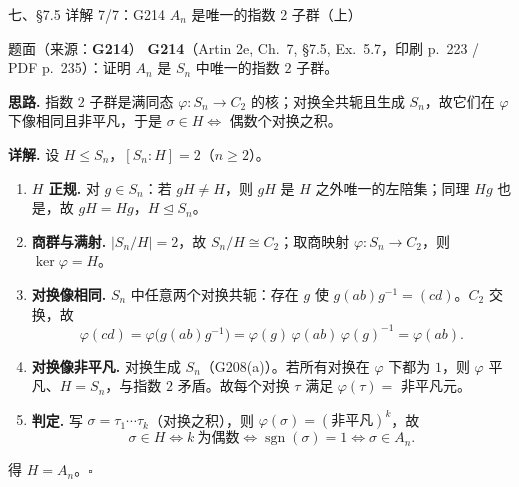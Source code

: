 \documentclass[aspectratio=169,10pt,fontset=none]{ctexbeamer}
\newcommand{\ex}[1]{\textcolor{accent}{\footnotesize\bfseries #1}}
\newcommand{\key}[1]{\textcolor{ink}{\bfseries #1}}
\begin{document}
\begin{frame}[t]{七、\S7.5 详解 7/7：G214 $A_n$ 是唯一的指数 2 子群（上）}
\label{ex:G214}
\scriptsize
\begin{block}{\footnotesize 题面（来源：\ex{G214}）}
\scriptsize
\ex{G214}（Artin 2e, Ch.~7, \S7.5, Ex.~5.7，印刷 p.~223 / PDF p.~235）：证明 $A_n$ 是 $S_n$ 中唯一的指数 $2$ 子群。
\end{block}
\key{思路.} 指数 $2$ 子群是满同态 $\varphi:S_n\to C_2$ 的核；对换全共轭且生成 $S_n$，故它们在 $\varphi$ 下像相同且非平凡，于是 $\sigma\in H\iff$ 偶数个对换之积。

\key{详解.} 设 $H\le S_n$，$[S_n:H]=2$（$n\ge2$）。
\begin{enumerate}\setlength{\itemsep}{0pt}\setlength{\parskip}{0pt}
  \item \key{$H$ 正规.} 对 $g\in S_n$：若 $gH\ne H$，则 $gH$ 是 $H$ 之外唯一的左陪集；同理 $Hg$ 也是，故 $gH=Hg$，$H\trianglelefteq S_n$。
  \item \key{商群与满射.} $|S_n/H|=2$，故 $S_n/H\cong C_2$；取商映射 $\varphi:S_n\to C_2$，则 $\ker\varphi=H$。
  \item \key{对换像相同.} $S_n$ 中任意两个对换共轭：存在 $g$ 使 $g(ab)g^{-1}=(cd)$。$C_2$ 交换，故
  \[ \varphi(cd)=\varphi\bigl(g(ab)g^{-1}\bigr)=\varphi(g)\,\varphi(ab)\,\varphi(g)^{-1}=\varphi(ab). \]
  \item \key{对换像非平凡.} 对换生成 $S_n$（G208(a)）。若所有对换在 $\varphi$ 下都为 $1$，则 $\varphi$ 平凡、$H=S_n$，与指数 $2$ 矛盾。故每个对换 $\tau$ 满足 $\varphi(\tau)=$ 非平凡元。
  \item \key{判定.} 写 $\sigma=\tau_1\cdots\tau_k$（对换之积），则 $\varphi(\sigma)=(\text{非平凡})^k$，故
  \[ \sigma\in H\iff k\ \text{为偶数}\iff\operatorname{sgn}(\sigma)=1\iff\sigma\in A_n. \]
\end{enumerate}
得 $H=A_n$。$\square$
\end{frame}
\end{document}
